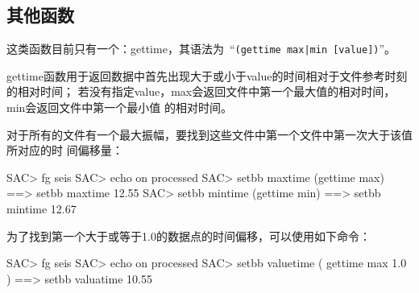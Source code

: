 \subsection{其他函数}
这类函数目前只有一个：gettime，其语法为~``\verb+(gettime max|min [value])+''。

gettime函数用于返回数据中首先出现大于或小于value的时间相对于文件参考时刻的相对时间；
若没有指定value，max会返回文件中第一个最大值的相对时间，min会返回文件中第一个最小值
的相对时间。

对于所有的文件有一个最大振幅，要找到这些文件中第一个文件中第一次大于该值所对应的时
间偏移量：
\begin{SACCode}
SAC> fg seis
SAC> echo on processed
SAC> setbb maxtime (gettime max)
 ==>  setbb maxtime 12.55
SAC> setbb mintime (gettime min)
 ==>  setbb mintime 12.67
\end{SACCode}

为了找到第一个大于或等于1.0的数据点的时间偏移，可以使用如下命令：
\begin{SACCode}
SAC> fg seis
SAC> echo on processed
SAC> setbb valuetime ( gettime max 1.0 )
 ==> setbb valuatime 10.55
\end{SACCode}
